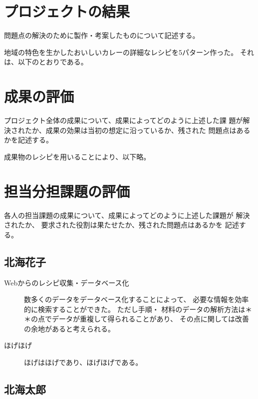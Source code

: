 \documentclass[openany,11pt,papersize]{jsbook}
\begin{document}
\section{プロジェクトの結果}
\begin{hissu}
問題点の解決のために製作・考案したものについて記述する。
\end{hissu}
地域の特色を生かしたおいしいカレーの詳細なレシピを5パターン作った。 
それは、以下のとおりである。


\section{成果の評価}
\begin{hissu}
 プロジェクト全体の成果について、成果によってどのように上述した課
 題が解決されたか、成果の効果は当初の想定に沿っているか、残された
 問題点はあるかを記述する。
\end{hissu}

成果物のレシピを用いることにより、以下略。




\section{担当分担課題の評価}
\begin{hissu}
各人の担当課題の成果について、成果によってどのように上述した課題が
解決されたか、 要求された役割は果たせたか、残された問題点はあるかを
記述する。
\end{hissu}

\subsection{北海花子}
\begin{description}
 \item[Webからのレシピ収集・データベース化] 
  数多くのデータをデータベース化することによって、
  必要な情報を効率的に検索することができた。 ただし手順・
  材料のデータの解析方法は＊＊の点でデータが重複して得られることがあり、
  その点に関しては改善の余地があると考えられる。 
 \item[ほげほげ]
  ほげはほげであり、ほげほげである。
\end{description}


\subsection{北海太郎}
\end{document}
